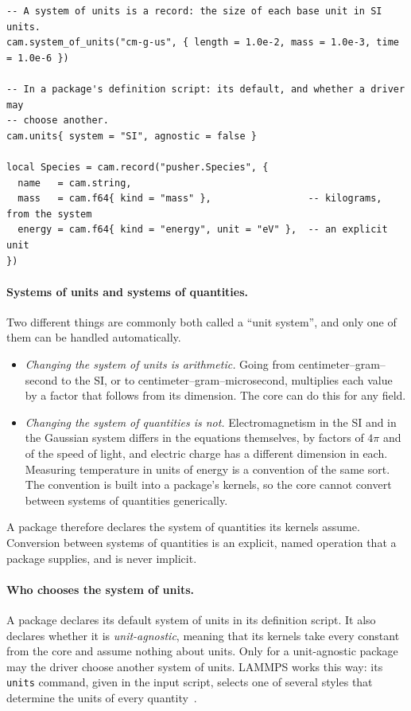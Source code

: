 \documentclass[11pt,a4paper]{article}
\newcommand{\code}[1]{\texttt{#1}}
\begin{document}
\begin{lstlisting}[language={[5.3]Lua}]
-- A system of units is a record: the size of each base unit in SI units.
cam.system_of_units("cm-g-us", { length = 1.0e-2, mass = 1.0e-3, time = 1.0e-6 })

-- In a package's definition script: its default, and whether a driver may
-- choose another.
cam.units{ system = "SI", agnostic = false }

local Species = cam.record("pusher.Species", {
  name   = cam.string,
  mass   = cam.f64{ kind = "mass" },                 -- kilograms, from the system
  energy = cam.f64{ kind = "energy", unit = "eV" },  -- an explicit unit
})
\end{lstlisting}

\paragraph{Systems of units and systems of quantities.}  Two different
things are commonly both called a \enquote{unit system}, and only one of
them can be handled automatically.

\begin{itemize}
  \item \emph{Changing the system of units is arithmetic.}  Going from
        centimeter--gram--second to the SI, or to
        centimeter--gram--microsecond, multiplies each value by a factor
        that follows from its dimension.  The core can do this for any
        field.
  \item \emph{Changing the system of quantities is not.}  Electromagnetism
        in the SI and in the Gaussian system differs in the equations
        themselves, by factors of $4\pi$ and of the speed of light, and
        electric charge has a different dimension in each.  Measuring
        temperature in units of energy is a convention of the same sort.
        The convention is built into a package's kernels, so the core cannot
        convert between systems of quantities generically.
\end{itemize}

A package therefore declares the system of quantities its kernels assume.
Conversion between systems of quantities is an explicit, named operation
that a package supplies, and is never implicit.

\paragraph{Who chooses the system of units.}  A package declares its default
system of units in its definition script.  It also declares whether it is
\emph{unit-agnostic}, meaning that its kernels take every constant from the
core and assume nothing about units.  Only for a unit-agnostic package may
the driver choose another system of units.  LAMMPS works this way: its
\code{units} command, given in the input script, selects one of several
styles that determine the units of every quantity~\cite{lammpsunits}.
\end{document}
